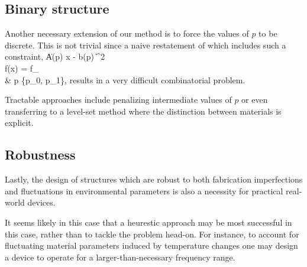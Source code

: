 \subsection{Binary structure}
Another necessary extension of our method is to force 
    the values of $p$ to be discrete.
This is not trivial since a naive restatement of 
    which includes such a constraint,
\BA {} \| A(p) x - b(p) \|^2 \notag \\
    \subto f(x) = f_ \\
        & p \in \{p_0, p_1\}, \notag \EA
    results in a very difficult combinatorial problem.

Tractable approaches include penalizing intermediate values of $p$\cite{simp}
    or even transferring to a level-set method\cite{miller}
    where the distinction between materials is explicit.

\subsection{Robustness}
Lastly, the design of structures which are robust to both
    fabrication imperfections and fluctuations in environmental parameters
    is also a necessity for practical real-world devices.

It seems likely in this case that a heurestic approach may
    be most successful in this case, rather than to tackle 
    the problem head-on.
For instance, to account for fluctuating material parameters
    induced by temperature changes
    one may design a device to operate for a larger-than-necessary 
    frequency range.

